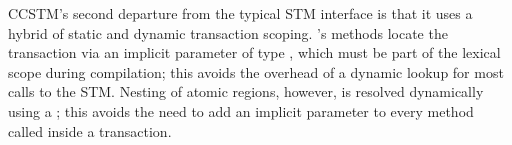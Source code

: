 
CCSTM's second departure from the typical STM interface is that it uses a
hybrid of static and dynamic transaction scoping.  's methods
locate the transaction via an implicit parameter of type ,
which must be part of the lexical scope during compilation; this
avoids the overhead of a dynamic lookup for most calls to the STM.
Nesting of atomic regions, however, is resolved dynamically using a
; this avoids the need to add an implicit 
parameter to every method called inside a transaction.



